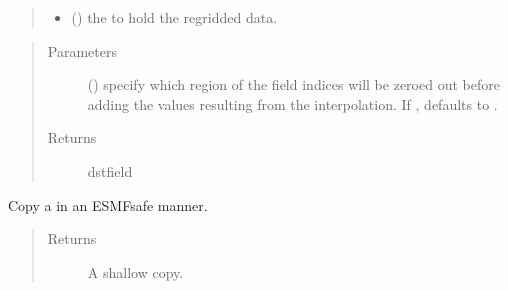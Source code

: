 \documentclass[letterpaper,10pt,english]{sphinxmanual}
\begin{document}
\begin{fulllineitems}
\begin{fulllineitems}
\begin{quote}
\begin{description}
\begin{itemize}
\item {} 
 ({\hyperref[\detokenize{field:ESMF.api.field.Field}]{}}) \textendash{} the {\hyperref[\detokenize{field:ESMF.api.field.Field}]{}} to hold the regridded data.

\end{itemize}

\end{description}\end{quote}

\begin{quote}\begin{description}
\item[{Parameters}] \leavevmode
{} ({\hyperref[\detokenize{Region:ESMF.api.constants.Region}]{}}) \textendash{} specify which region of the field indices
will be zeroed out before adding the values resulting from the
interpolation.  If , defaults to
{\hyperref[\detokenize{Region:ESMF.api.constants.Region.TOTAL}]{}}.

\item[{Returns}] \leavevmode
dstfield

\end{description}\end{quote}

\end{fulllineitems}


\begin{fulllineitems}
\label{\detokenize{regridfromfile:ESMF.api.regrid.RegridFromFile.copy}}
Copy a {\hyperref[\detokenize{regrid:ESMF.api.regrid.Regrid}]{}} in an ESMF\sphinxhyphen{}safe manner.
\begin{quote}\begin{description}
\item[{Returns}] \leavevmode
A {\hyperref[\detokenize{regrid:ESMF.api.regrid.Regrid}]{}} shallow copy.


\end{description}
\end{quote}
\end{fulllineitems}
\end{fulllineitems}
\end{document}
